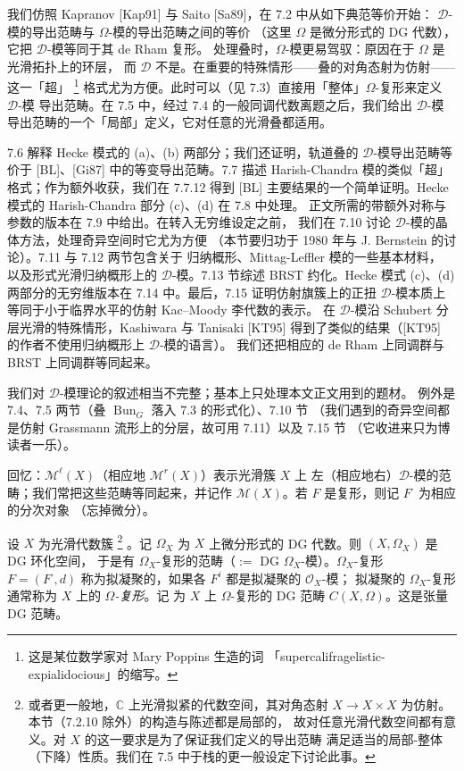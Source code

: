我们仿照 Kapranov [Kap91] 与 Saito [Sa89]，在 7.2 中从如下典范等价开始：
$\mathcal{D}$-模的导出范畴与 $\Omega$-模的导出范畴之间的等价
（这里 $\Omega$ 是微分形式的 DG 代数），它把 $\mathcal{D}$-模等同于其 de Rham 复形。
处理叠时，$\Omega$-模更易驾驭：原因在于 $\Omega$ 是光滑拓扑上的环层，
而 $\mathcal{D}$ 不是。在重要的特殊情形——叠的对角态射为仿射——这一「超」%
\footnote{这是某位数学家对 Mary Poppins 生造的词
「supercalifragelistic-expialidocious」的缩写。
}%
格式尤为方便。此时可以（见 7.3）直接用「整体」$\Omega$-复形来定义 $\mathcal{D}$-模
导出范畴。在 7.5 中，经过 7.4 的一般同调代数离题之后，我们给出 $\mathcal{D}$-模
导出范畴的一个「局部」定义，它对任意的光滑叠都适用。

7.6 解释 Hecke 模式的 (a)、(b) 两部分；我们还证明，轨道叠的
$\mathcal{D}$-模导出范畴等价于 [BL]、[Gi87] 中的等变导出范畴。7.7 描述
Harish-Chandra 模的类似「超」格式；作为额外收获，我们在 7.7.12 得到 [BL]
主要结果的一个简单证明。Hecke 模式的 Harish-Chandra 部分 (c)、(d) 在 7.8 中处理。
正文所需的带额外对称与参数的版本在 7.9 中给出。在转入无穷维设定之前，
我们在 7.10 讨论 $\mathcal{D}$-模的晶体方法，处理奇异空间时它尤为方便
（本节要归功于 1980 年与 J. Bernstein 的讨论）。7.11 与 7.12 两节包含关于
归纳概形、Mittag-Leffler 模的一些基本材料，%
%
以及形式光滑归纳概形上的 $\mathcal{D}$-模。7.13 节综述 BRST 约化。Hecke 模式
(c)、(d) 两部分的无穷维版本在 7.14 中。最后，7.15 证明仿射旗簇上的正扭
$\mathcal{D}$-模本质上等同于小于临界水平的仿射 Kac–Moody 李代数的表示。
在 $\mathcal{D}$-模沿 Schubert 分层光滑的特殊情形，Kashiwara 与 Tanisaki [KT95]
得到了类似的结果（[KT95] 的作者不使用归纳概形上 $\mathcal{D}$-模的语言）。
我们还把相应的 de Rham 上同调群与 BRST 上同调群等同起来。

我们对 $\mathcal{D}$-模理论的叙述相当不完整；基本上只处理本文正文用到的题材。
例外是 7.4、7.5 两节（叠 $\operatorname{Bun}_G$ 落入 7.3 的形式化）、7.10 节
（我们遇到的奇异空间都是仿射 Grassmann 流形上的分层，故可用 7.11）以及 7.15 节
（它收进来只为博读者一乐）。

回忆：$\mathcal{M}^{\ell}(X)$（相应地 $\mathcal{M}^{r}(X)$）表示光滑簇 $X$ 上
左（相应地右）$\mathcal{D}$-模的范畴；我们常把这些范畴等同起来，并记作
$\mathcal{M}(X)$。若 $F$ 是复形，则记 $F^{\cdot}$ 为相应的分次对象
（忘掉微分）。


 设 $X$ 为光滑代数簇%
\footnote{或者更一般地，$\mathbb{C}$ 上光滑拟紧的代数空间，其对角态射
$X\to X\times X$ 为仿射。本节（7.2.10 除外）的构造与陈述都是局部的，
故对任意光滑代数空间都有意义。对 $X$ 的这一要求是为了保证我们定义的导出范畴
满足适当的局部-整体（下降）性质。我们在 7.5 中于栈的更一般设定下讨论此事。}%
。记 $\Omega_X$ 为 $X$ 上微分形式的 DG 代数。则 $(X,\Omega_X)$ 是 DG 环化空间，
于是有 $\Omega_X$-复形的范畴（$:=$ DG $\Omega_X$-模）。$\Omega_X$-复形
$F=(F^{\cdot},d)$ 称为拟凝聚的，如果各 $F^i$ 都是拟凝聚的 $\mathcal{O}_X$-模；
拟凝聚的 $\Omega_X$-复形通常称为 $X$ 上的 \emph{$\Omega$-复形}。记%
%
为 $X$ 上 $\Omega$-复形的 DG 范畴 $C(X,\Omega)$。这是张量 DG 范畴。

